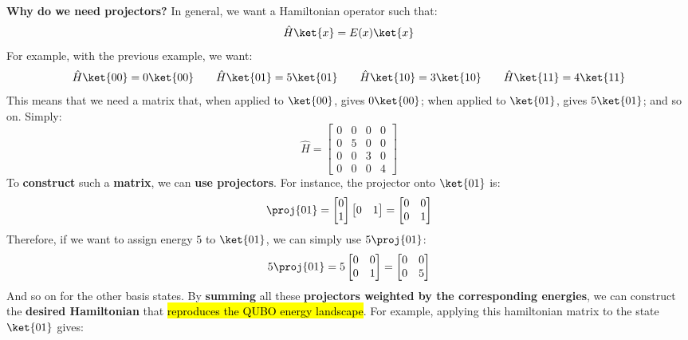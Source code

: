 \highspace
\textcolor{Green3}{ \textbf{Why do we need projectors?}} In general, we want a Hamiltonian operator such that:
\begin{equation*}
    \hat{H} \ket{x} = E(x) \ket{x}
\end{equation*}
For example, with the previous example, we want:
\begin{equation*}
    \hat{H} \ket{00} = 0 \ket{00} \qquad \hat{H} \ket{01} = 5 \ket{01} \qquad \hat{H} \ket{10} = 3 \ket{10} \qquad \hat{H} \ket{11} = 4 \ket{11}
\end{equation*}
This means that we need a matrix that, when applied to $\ket{00}$, gives $0 \ket{00}$; when applied to $\ket{01}$, gives $5 \ket{01}$; and so on. Simply:
\begin{equation*}
    \hat{H} = \begin{bmatrix}
        0 & 0 & 0 & 0 \\
        0 & 5 & 0 & 0 \\
        0 & 0 & 3 & 0 \\
        0 & 0 & 0 & 4
    \end{bmatrix}
\end{equation*}
To \textbf{construct} such a \textbf{matrix}, we can \textbf{use projectors}. For instance, the projector onto $\ket{01}$ is:
\begin{equation*}
    \proj{01} = \begin{bmatrix}
        0 \\ 1
    \end{bmatrix}
    \begin{bmatrix}
        0 & 1
    \end{bmatrix} = \begin{bmatrix}
        0 & 0 \\
        0 & 1
    \end{bmatrix}
\end{equation*}
Therefore, if we want to assign energy $5$ to $\ket{01}$, we can simply use $5 \proj{01}$:
\begin{equation*}
    5 \proj{01} = 5 \begin{bmatrix}
        0 & 0 \\
        0 & 1
    \end{bmatrix} = \begin{bmatrix}
        0 & 0 \\
        0 & 5
    \end{bmatrix}
\end{equation*}
And so on for the other basis states. By \textbf{summing} all these \textbf{projectors weighted by the corresponding energies}, we can construct the \textbf{desired Hamiltonian} that \hl{reproduces the QUBO energy landscape}. For example, applying this hamiltonian matrix to the state $\ket{01}$ gives:
